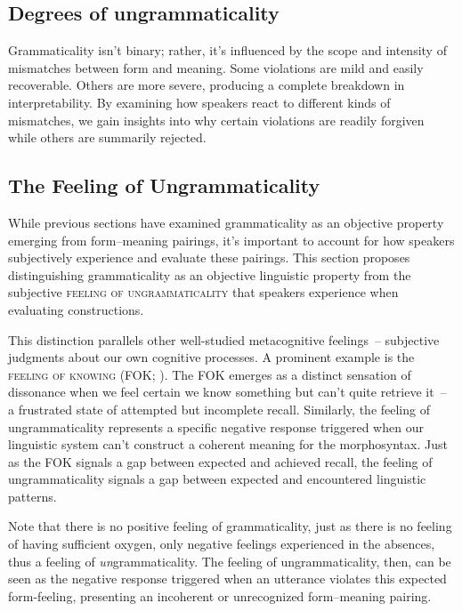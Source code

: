 \subsection{Degrees of ungrammaticality}\label{sec:degrees}

Grammaticality isn't binary; rather, it's influenced by the scope and intensity of mismatches between form and meaning. Some violations are mild and easily recoverable. Others are more severe, producing a complete breakdown in interpretability. By examining how speakers react to different kinds of mismatches, we gain insights into why certain violations are readily forgiven while others are summarily rejected.

\subsection{The Feeling of Ungrammaticality}\label{sec:feeling}

While previous sections have examined grammaticality as an objective property emerging from form--meaning pairings, it's important to account for how speakers subjectively experience and evaluate these pairings. This section proposes distinguishing grammaticality as an objective linguistic property from the subjective \textsc{feeling of ungrammaticality} that speakers experience when evaluating constructions.

This distinction parallels other well-studied metacognitive feelings~-- subjective judgments about our own cognitive processes. A prominent example is the \textsc{feeling of knowing} (FOK; \cite{hart1965}). The FOK emerges as a distinct sensation of dissonance when we feel certain we know something but can't quite retrieve it~-- a frustrated state of attempted but incomplete recall. Similarly, the feeling of ungrammaticality represents a specific negative response triggered when our linguistic system can't construct a coherent meaning for the morphosyntax. Just as the FOK signals a gap between expected and achieved recall, the feeling of ungrammaticality signals a gap between expected and encountered linguistic patterns.

Note that there is no positive feeling of grammaticality, just as there is no feeling of having sufficient oxygen, only negative feelings experienced in the absences, thus a feeling of \emph{un}grammaticality. The feeling of ungrammaticality, then, can be seen as the negative response triggered when an utterance violates this expected form-feeling, presenting an incoherent or unrecognized form--meaning pairing.

